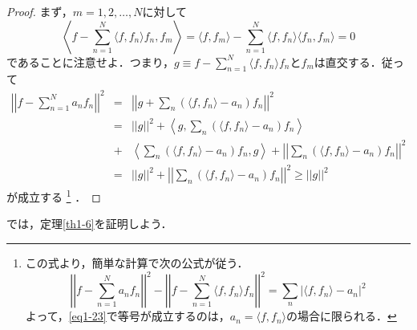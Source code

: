 \documentclass[a4j]{jsbook}
\numberwithin{theorem}{chapter}  %
\begin{document}
\begin{proof}
まず，\(m=1, 2, \dots, N\)に対して
\begin{equation*}
    \left\langle f-\sum_{n=1}^N\langle f, f_n\rangle f_n, f_m\right\rangle=\langle f, f_m\rangle-\sum_{n=1}^N\langle f, f_n\rangle\langle f_n, f_m\rangle=0
\end{equation*}
であることに注意せよ．つまり，\(\displaystyle g\equiv f-\sum_{n=1}^N\langle f, f_n\rangle f_n\)と\(f_m\)は直交する．従って
\begin{eqnarray*}
\left|\left|f-\sum_{n=1}^N a_nf_n\right|\right|^2&=&\left|\left|g+\sum_n (\langle f, f_n\rangle-a_n)f_n\right|\right|^2 \\
    &=&||g||^2+\left\langle g, \sum_n (\langle f, f_n\rangle-a_n)f_n\right\rangle \\
    &+&\left\langle\sum_n (\langle f, f_n\rangle-a_n)f_n, g\right\rangle+\left|\left|\sum_n (\langle f, f_n\rangle-a_n)f_n\right|\right|^2 \\
    &=&||g||^2+\left|\left|\sum_n (\langle f, f_n\rangle-a_n)f_n\right|\right|^2\geq||g||^2
\end{eqnarray*}
が成立する
\footnote{
この式より，簡単な計算で次の公式が従う．
\begin{equation*}
    \left|\left|f-\sum_{n=1}^N a_nf_n\right|\right|^2-\left|\left|f-\sum_{n=1}^N\langle f, f_n\rangle f_n\right|\right|^2=\sum_n |\langle f, f_n\rangle-a_n|^2
\end{equation*}
よって，\eqref{eq1-23}で等号が成立するのは，\(a_n=\langle f, f_n\rangle\)の場合に限られる．
}
．
\end{proof}
では，定理\ref{th1-6}を証明しよう．
\end{document}
